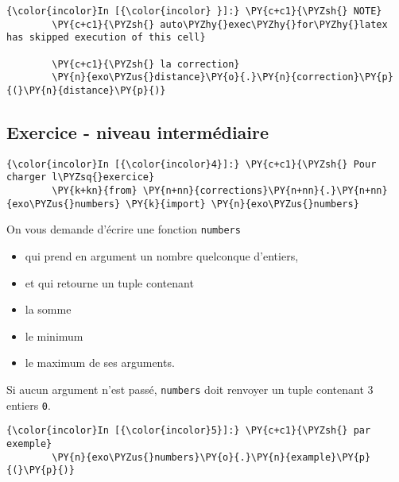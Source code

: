     \begin{Verbatim}[commandchars=\\\{\},frame=single,framerule=0.3mm,rulecolor=\color{cellframecolor}]
{\color{incolor}In [{\color{incolor} }]:} \PY{c+c1}{\PYZsh{} NOTE}
        \PY{c+c1}{\PYZsh{} auto\PYZhy{}exec\PYZhy{}for\PYZhy{}latex has skipped execution of this cell}
        
        \PY{c+c1}{\PYZsh{} la correction}
        \PY{n}{exo\PYZus{}distance}\PY{o}{.}\PY{n}{correction}\PY{p}{(}\PY{n}{distance}\PY{p}{)}
\end{Verbatim}


    \hypertarget{exercice---niveau-intermuxe9diaire}{%
\subsection{Exercice - niveau
intermédiaire}\label{exercice---niveau-intermuxe9diaire}}

    \begin{Verbatim}[commandchars=\\\{\},frame=single,framerule=0.3mm,rulecolor=\color{cellframecolor}]
{\color{incolor}In [{\color{incolor}4}]:} \PY{c+c1}{\PYZsh{} Pour charger l\PYZsq{}exercice}
        \PY{k+kn}{from} \PY{n+nn}{corrections}\PY{n+nn}{.}\PY{n+nn}{exo\PYZus{}numbers} \PY{k}{import} \PY{n}{exo\PYZus{}numbers}
\end{Verbatim}


    On vous demande d'écrire une fonction \texttt{numbers}

\begin{itemize}
\tightlist
\item
  qui prend en argument un nombre quelconque d'entiers,
\item
  et qui retourne un tuple contenant
\item
  la somme
\item
  le minimum
\item
  le maximum de ses arguments.
\end{itemize}

    Si aucun argument n'est passé, \texttt{numbers} doit renvoyer un tuple
contenant 3 entiers \texttt{0}.

    \begin{Verbatim}[commandchars=\\\{\},frame=single,framerule=0.3mm,rulecolor=\color{cellframecolor}]
{\color{incolor}In [{\color{incolor}5}]:} \PY{c+c1}{\PYZsh{} par exemple}
        \PY{n}{exo\PYZus{}numbers}\PY{o}{.}\PY{n}{example}\PY{p}{(}\PY{p}{)}
\end{Verbatim}


